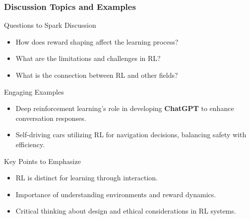 \documentclass[aspectratio=169]{beamer}
\begin{document}
\begin{frame}[fragile]
    \frametitle{Discussion Topics and Examples}
    \begin{block}{Questions to Spark Discussion}
        \begin{itemize}
            \item How does reward shaping affect the learning process?
            \item What are the limitations and challenges in RL?
            \item What is the connection between RL and other fields?
        \end{itemize}
    \end{block}
    
    \begin{block}{Engaging Examples}
        \begin{itemize}
            \item Deep reinforcement learning's role in developing \textbf{ChatGPT} to enhance conversation responses.
            \item Self-driving cars utilizing RL for navigation decisions, balancing safety with efficiency.
        \end{itemize}
    \end{block}

    \begin{block}{Key Points to Emphasize}
        \begin{itemize}
            \item RL is distinct for learning through interaction.
            \item Importance of understanding environments and reward dynamics.
            \item Critical thinking about design and ethical considerations in RL systems.
        \end{itemize}
    \end{block}
\end{frame}
\end{document}
